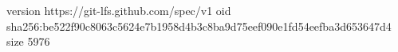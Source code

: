 version https://git-lfs.github.com/spec/v1
oid sha256:be522f90c8063c5624e7b1958d4b3c8ba9d75eef090e1fd54eefba3d653647d4
size 5976
